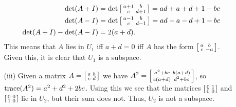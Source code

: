 \documentclass[a4paper]{article}
\begin{document}
\begin{solution}
\begin{itemize}
\begin{itemize}
\begin{align*}
      \det(A+I) &= \det\left[\begin{smallmatrix} a+1 & b \\ c & d+1 \end{smallmatrix}\right] 
                 = ad+a+d+1-bc \\
      \det(A-I) &= \det\left[\begin{smallmatrix} a-1 & b \\ c & d-1 \end{smallmatrix}\right] 
                 = ad-a-d+1-bc \\
      \det(A+I)-\det(A-I) &= 2(a+d).
     \end{align*}
     This means that $A$ lies in $U_1$ iff $a+d=0$ iff $A$ has the
     form $\left[\begin{smallmatrix} a&b \\c&-a\end{smallmatrix}\right]$.  Given this, it is clear that $U_1$
     is a subspace.  
    \item[(iii)] Given a matrix $A=\left[\begin{smallmatrix} a&b\\ c&d\end{smallmatrix}\right]$ we have
     $A^2=\left[\begin{smallmatrix} a^2+bc & b(a+d) \\ c(a+d) & d^2+bc\end{smallmatrix}\right]$, so
     $\operatorname{trace}(A^2)=a^2+d^2+2bc$.  Using this we see that the matrices
     $\left[\begin{smallmatrix} 0&1\\0&0\end{smallmatrix}\right]$ and $\left[\begin{smallmatrix} 0&0\\1&0\end{smallmatrix}\right]$ lie in $U_2$, but
     their sum does not.  Thus, $U_2$ is not a subspace. 
   \end{itemize}
 \end{itemize}
\end{solution}
\end{document}
